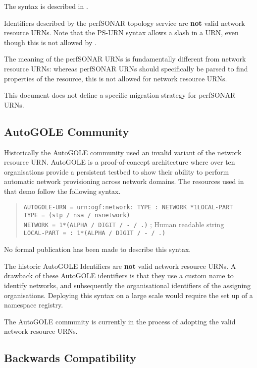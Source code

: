 \documentclass[12pt]{article}  %
\begin{document}
The syntax is described in \cite{ps-urn}.

Identifiers described by the perfSONAR topology service are \textbf{not} valid network resource URNs.
Note that the PS-URN syntax allows a slash in a URN, even though this is not allowed by \cite{rfc2141}.

The meaning of the perfSONAR URNs is fundamentally different from network resource URNs:
whereas perfSONAR URNs should specifically be parsed to find properties of the resource, 
this is not allowed for network resource URNs.

This document does not define a specific migration strategy for perfSONAR URNs.

\subsection{AutoGOLE Community}

Historically the AutoGOLE community used an invalid variant of the network resource URN. AutoGOLE is a proof-of-concept architecture where over ten organisations provide a persistent testbed to show their ability to perform automatic network provisioning across network domains. The resources used in that demo follow the following syntax.

\begin{quote}
  \texttt{AUTOGOLE-URN = \qq{}urn:ogf:network:\qq{} TYPE \qq{}:\qq{} NETWORK *1LOCAL-PART} \\
  \texttt{TYPE = (\qq{}stp\qq{} / \qq{}nsa\qq{} / \qq{}nsnetwork\qq{})} \\
  \texttt{NETWORK = 1*(ALPHA / DIGIT / \qq{}-\qq{} / \qq{}.\qq{})} ; Human readable string \\
  \texttt{LOCAL-PART = \qq{}:\qq{} 1*(ALPHA / DIGIT / \qq{}-\qq{} / \qq{}.\qq{})}
\end{quote}

No formal publication has been made to describe this syntax.

The historic AutoGOLE Identifiers are \textbf{not} valid network resource URNs. A drawback 
of these AutoGOLE identifiers is that they use a custom name to identify networks, 
and subsequently the organisational identifiers of the assigning organisations. 
Deploying this syntax on a large scale would require the set up of a namespace registry.

The AutoGOLE community is currently in the process of adopting the valid network resource URNs.

\subsection{Backwards Compatibility}
\end{document}
